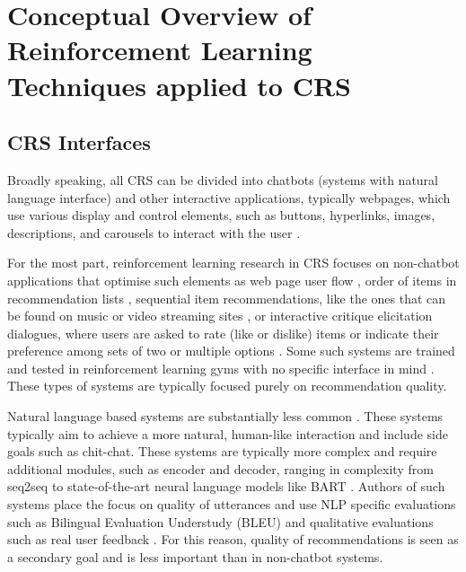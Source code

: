 \chapter{Conceptual Overview of Reinforcement Learning Techniques applied to CRS}
\label{ch:rl_crs} 

\section{CRS Interfaces}
Broadly speaking, all CRS can be divided into chatbots (systems with natural language interface) and other interactive applications, typically webpages, which use various display and control elements, such as buttons, hyperlinks, images, descriptions, and carousels to interact with the user \citep{jannach2021survey}.

For the most part, reinforcement learning research in CRS focuses on non-chatbot applications that optimise such elements as web page user flow \citep{mahmood2009improving, mahmood2009learning}, order of items in recommendation lists \citep{viappiani2009regret}, sequential item recommendations, like the ones that can be found on music or video streaming sites \citep{zhao2013interactive}, or interactive critique elicitation dialogues, where users are asked to rate (like or dislike) items or indicate their preference among sets of two or multiple options \citep{christakopoulou2016towards}. Some such systems are trained and tested in reinforcement learning gyms with no specific interface in mind \citep{sun2018conversational, lei2020estimation, li2021seamlessly}. These types of systems are typically focused purely on recommendation quality. 

Natural language based systems are substantially less common \citep{greco2017converse, sun2018conversational, tsumita2019dialogue, kang2019recommendation, wang2022improving, zhou2022c2}. These systems typically aim to achieve a more natural, human-like interaction and include side goals such as chit-chat. These systems are typically more complex and require additional modules, such as encoder and decoder, ranging in complexity from seq2seq \citep{greco2017converse} to state-of-the-art neural language models like BART \citep{wang2022improving}. Authors of such systems place the focus on quality of utterances and use NLP specific evaluations such as Bilingual Evaluation Understudy (BLEU) \citep{greco2017converse} and qualitative evaluations such as real user feedback \citep{kang2019recommendation}. For this reason, quality of recommendations is seen as a secondary goal and is less important than in non-chatbot systems.

